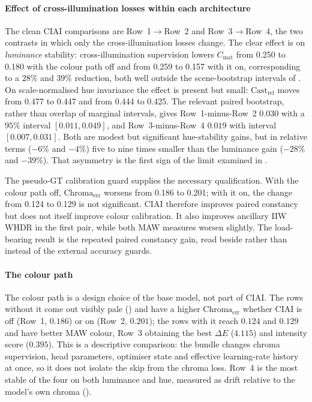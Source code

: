 \paragraph{Effect of cross-illumination losses within each architecture}
The clean CIAI comparisons are Row~1$\rightarrow$Row~2 and
Row~3$\rightarrow$Row~4, the two contrasts in which only the cross-illumination losses change.
The clear effect is on \emph{luminance} stability: cross-illumination supervision lowers
$C_{\text{mat}}$ from 0.250 to 0.180 with the colour path off and from 0.259 to 0.157 with
it on, corresponding to a $28\%$ and $39\%$ reduction, both well outside the scene-bootstrap intervals of
. On scale-normalised hue invariance the effect is present but small:
$\text{Cast}_{\text{rel}}$ moves from 0.477 to 0.447 and from 0.444 to 0.425.
The relevant paired bootstrap, rather than overlap of marginal intervals, gives
Row~1-minus-Row~2 $0.030$ with a $95\%$ interval $[0.011,0.049]$, and
Row~3-minus-Row~4 $0.019$ with interval $[0.007,0.031]$. Both are modest but
significant hue-stability gains, but in relative terms ($-6\%$ and $-4\%$) five to nine
times smaller than the luminance gain ($-28\%$ and $-39\%$). That asymmetry is the first sign of the limit examined in
.

The pseudo-GT calibration guard supplies the necessary qualification. With the colour
path off, $\text{Chroma}_{\text{err}}$ worsens from 0.186 to 0.201; with it on, the
change from 0.124 to 0.129 is not significant. CIAI therefore improves paired
constancy but does not itself improve colour calibration. It also improves ancillary
IIW WHDR in the first pair, while both MAW measures worsen slightly. The load-bearing
result is the repeated paired constancy gain, read beside rather than instead of the
external accuracy guards.

\paragraph{The colour path}
The colour path is a design choice of the base model, not part of CIAI. The rows without it
come out visibly pale () and have a higher $\text{Chroma}_{\text{err}}$
whether CIAI is off (Row~1, $0.186$) or on (Row~2, $0.201$); the rows with it reach $0.124$ and
$0.129$ and have better MAW colour, Row~3 obtaining the best $\Delta E$
($4.115$) and intensity score ($0.395$). This is a descriptive comparison: the bundle
changes chroma supervision, head parameters, optimiser state and effective learning-rate
history at once, so it does not isolate the skip from the chroma loss. Row~4 is the most
stable of the four on both luminance and hue, measured as drift relative to the model's own
chroma ().

